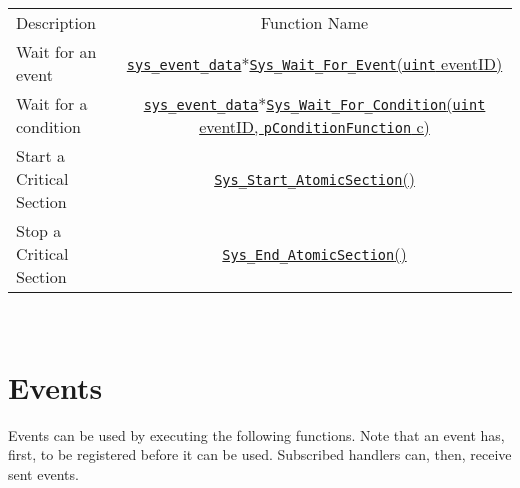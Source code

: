 \documentclass[a4paper,9pt]{extarticle}
\newcommand{\uintt}{\href{http://openswarm.org/os-doc/d6/dc2/definitions\_8h.html\#a1445ebbbf93d62972255ec5e89a5ab01}{\texttt{uint}}\xspace}
\newcommand{\syseventdata}{\href{http://openswarm.org/os-doc/d7/d0c/structsys__event__data.html}{\texttt{sys\_event\_data}}\xspace}
\newcommand{\pConditionFunction}{\href{http://openswarm.org/os-doc/db/dd2/events\_8h.html\#a653a4a4b7d9f5a65e1415365267a9d9e}{\texttt{pConditionFunction}}\xspace}
\begin{document}
\begin{center}   
\begin{tabular}{lc}
    \rowcolor{blue!50}
    Description				&	Function Name\\
    Wait for an event  	& 	\syseventdata *\href{http://openswarm.org/os-doc/da/d14/process__Management_8c.html#a4b45be80626e64bb659b16e5dabcfc1d}{\texttt{Sys\_Wait\_For\_Event}(\uintt eventID)}\\
    Wait for a condition  	& 	\syseventdata *\href{http://openswarm.org/os-doc/da/d14/process__Management_8c.html#a4b45be80626e64bb659b16e5dabcfc1d}{\texttt{Sys\_Wait\_For\_Condition}(\uintt eventID, \pConditionFunction c)}\\
    Start a Critical Section  	& 	\href{http://openswarm.org/os-doc/da/d14/process__Management_8c.html#a355c5fe8c9052d6bd2ddd7ff8e8783f0}{\texttt{Sys\_Start\_AtomicSection}()}\\
    Stop a Critical Section  	& 	\href{http://openswarm.org/os-doc/dd/de5/process__Management_8h.html#ae1b0a2e19c666539afa53d571c914d6e}{\texttt{Sys\_End\_AtomicSection}()}\\
\end{tabular} \\
\end{center}

\section{Events}
Events can be used by executing the following functions. Note that an event has, first, to be registered before it can be used. Subscribed handlers can, then, receive sent events.\\
\end{document}
